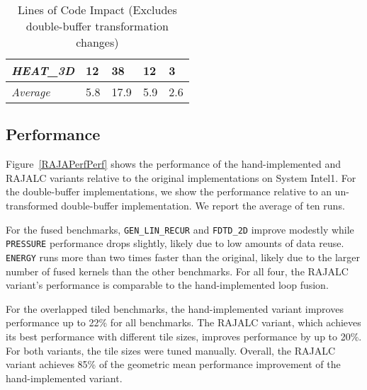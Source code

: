 \begin{table}[t]
\begin{tabular}{|l|l|l|l|l|}
\\
\textit{HEAT\_3D}        & 12                                              & 38                                           & 12                                             & 3                                            \\ \hline
\textit{Average}        & 5.8                                              & 17.9                                           & 5.9                                            & 2.6                                            \\ \hline
\end{tabular}
\caption{Lines of Code Impact (Excludes double-buffer transformation changes)}\label{sloc}
\end{table}


\subsection{Performance}

Figure~\ref{RAJAPerfPerf} shows the performance of the hand-implemented
and RAJALC variants relative to the original implementations on System Intel1. 
For the double-buffer implementations, we show the performance relative to an 
un-transformed double-buffer implementation. 
We report the average of ten runs. 

For the fused benchmarks, \verb.GEN_LIN_RECUR. and \verb.FDTD_2D. improve
modestly while \verb.PRESSURE. performance drops slightly, likely due to low amounts of data reuse. 
\verb.ENERGY. runs more than two times faster than the original, likely due
to the larger number of fused kernels than the other benchmarks. 
For all four, the RAJALC variant's performance is comparable to the
hand-implemented loop fusion. 
 
For the overlapped tiled benchmarks, the hand-implemented variant improves
performance up to 22\% for all benchmarks.
The RAJALC variant, which achieves its best performance with different tile sizes, improves performance by 
up to 20\%.
For both variants, the tile sizes were tuned manually.
Overall, the RAJALC variant achieves 85\% of the geometric mean performance
improvement of the hand-implemented variant. 




